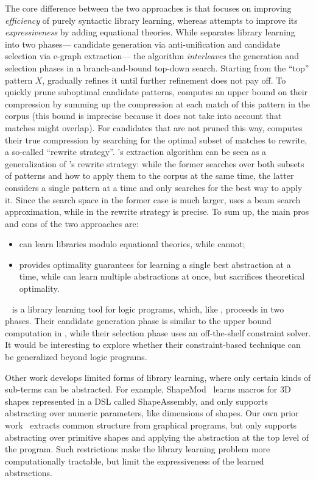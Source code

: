 \mypara{\stitch}
%
The core difference between the two approaches
is that \stitch focuses on improving \emph{efficiency} of purely syntactic library learning,
whereas \tool attempts to improve its \emph{expressiveness} by adding equational theories.
%
While \tool separates library learning into two phases---%
candidate generation via anti-unification and candidate selection via e-graph extraction---%
the \stitch algorithm \emph{interleaves} the generation and selection phases
in a branch-and-bound top-down search.
%
Starting from the ``top'' pattern $X$,
\stitch gradually refines it until further refinement does not pay off.
%
To quickly prune suboptimal candidate patterns,
\stitch computes an upper bound on their compression
by summing up the compression at each match of this pattern in the corpus
(this bound is imprecise because it does not take into account that matches might overlap).
%
For candidates that are not pruned this way,
\stitch computes their true compression by searching for the optimal subset of matches to rewrite,
a so-called ``rewrite strategy''.
%
\tool's extraction algorithm can be seen as a generalization of \stitch's rewrite strategy:
while the former searches over both subsets of patterns and how to apply them to the corpus at the same time,
the latter considers a single pattern at a time and only searches for the best way to apply it.
%
Since the search space in the former case is much larger,
\tool uses a beam search approximation,
while in \stitch the rewrite strategy is precise.
%
To sum up, the main pros and cons of the two approaches are:
\begin{itemize}
\item \tool can learn libraries modulo equational theories, while \stitch cannot;
\item \stitch provides optimality guarantees for learning a single best abstraction at a time, while \tool can learn multiple abstractions at once, but sacrifices theoretical optimality.
\end{itemize}


%
~\cite{knorf} is a library learning tool for logic programs,
which, like \tool, proceeds in two phases.
%
Their candidate generation phase is similar to the upper bound computation in \stitch,
while their selection phase uses an off-the-shelf constraint solver.
%
It would be interesting to explore whether their constraint-based technique can be generalized beyond logic programs.

Other work develops limited forms of library learning,
where only certain kinds of sub-terms can be abstracted.
%
For example, ShapeMod~\cite{shapemod} learns macros
  for 3D shapes represented
  in a DSL called ShapeAssembly,
  and only supports abstracting over numeric parameters,
  like dimensions of shapes.
%
Our own prior work~\cite{cogsci-smiley} extracts common structure from graphical programs,
  but only supports abstracting over primitive shapes
  and applying the abstraction at the top level of the program.
%
Such restrictions make the library learning problem more computationally tractable,
  but limit the expressiveness of the learned abstractions.

